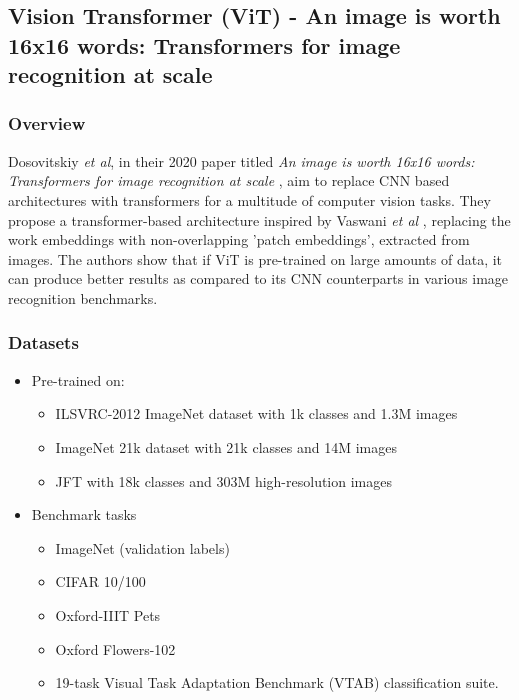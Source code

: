 \subsection{Vision Transformer (ViT) - An image is worth 16x16 words: Transformers for image recognition at scale}

\subsubsection{Overview}

\par Dosovitskiy \textit{et al}, in their 2020 paper titled \textit{An image is worth 16x16 words: Transformers for image recognition at scale} \cite{vit}, aim to replace CNN based architectures with transformers for a multitude of computer vision tasks. They propose a transformer-based architecture inspired by Vaswani \textit{et al} \cite{tfm}, replacing the work embeddings with non-overlapping 'patch embeddings', extracted from images. The authors show that if ViT is pre-trained on large amounts of data, it can produce better results as compared to its CNN counterparts in various image recognition benchmarks.\par


\subsubsection{Datasets}
\begin{itemize}
\item Pre-trained on:
	\begin{itemize}
		\item ILSVRC-2012 ImageNet dataset with 1k classes and 1.3M images
		\item ImageNet 21k dataset with 21k classes and 14M images 
		\item JFT with 18k classes and 303M high-resolution images
	\end{itemize}
\item Benchmark tasks
	\begin{itemize}
		\item ImageNet (validation labels)
		\item CIFAR 10/100
		\item Oxford-IIIT Pets
		\item Oxford Flowers-102
		\item 19-task Visual Task Adaptation Benchmark (VTAB) classification suite.
	\end{itemize}
\end{itemize}


